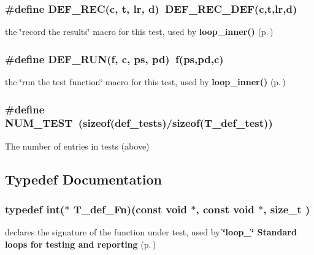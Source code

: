 \subsubsection{\setlength{\rightskip}{0pt plus 5cm}\#define DEF\_\-REC(c, t, lr, d)\ DEF\_\-REC\_\-DEF(c,t,lr,d)}\label{memcmp_2def__test_8h_a3}


the \char`\"{}record the results\char`\"{} macro for this test, used by {\bf loop\_\-inner()} {\rm (p.\,\pageref{group__loop__test_a6})} 
\subsubsection{\setlength{\rightskip}{0pt plus 5cm}\#define DEF\_\-RUN(f, c, ps, pd)\ f(ps,pd,c)}\label{memcmp_2def__test_8h_a2}


the \char`\"{}run the test function\char`\"{} macro for this test, used by {\bf loop\_\-inner()} {\rm (p.\,\pageref{group__loop__test_a6})} 
\subsubsection{\setlength{\rightskip}{0pt plus 5cm}\#define NUM\_\-TEST\ (sizeof({\bf def\_\-tests})/sizeof({\bf T\_\-def\_\-test}))}\label{memcmp_2def__test_8h_a0}


The number of entries in tests (above) 

\subsection{Typedef Documentation}
\subsubsection{\setlength{\rightskip}{0pt plus 5cm}typedef int($\ast$ T\_\-def\_\-Fn)(const void $\ast$, const void $\ast$, size\_\-t )}\label{memcmp_2def__test_8h_a4}


declares the signature of the function under test, used by {\bf \char`\"{}loop\_\-\char`\"{} Standard loops for testing and reporting} {\rm (p.\,\pageref{group__loop__test})} 

